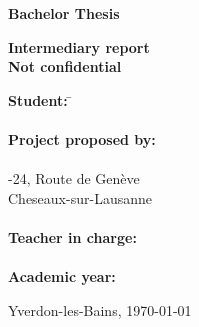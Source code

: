 
\begin{titlepage}
  \thispagestyle{firstpage}
  \begin{center}
    \vspace*{3cm}

    \Huge
    \textbf{Bachelor Thesis}

    \vspace{1cm}
    \Huge
    \TBtitle

    \vspace{0.2cm}
    \Large
    \textbf{Intermediary report}\\
    \textbf{Not confidential}
  \end{center}

  \vspace{6.5cm}
  \begin{tabbing}
    \linespread{3}\textbf{Student:} \hspace{12em} \= \TBauthor\\\\

    \textbf{Project proposed by:} \> \TBindustryContact\\
    \> \TBindustryName\\
    -24, Route de Genève\\
     Cheseaux-sur-Lausanne\\\\

    \textbf{Teacher in charge:} \> \TBsupervisor\\\\

    \textbf{Academic year:} \> \TBacademicYears
  \end{tabbing}

  \vspace{2.5cm}
  \begin{flushright}
    Yverdon-les-Bains, \today
  \end{flushright}
\end{titlepage}

